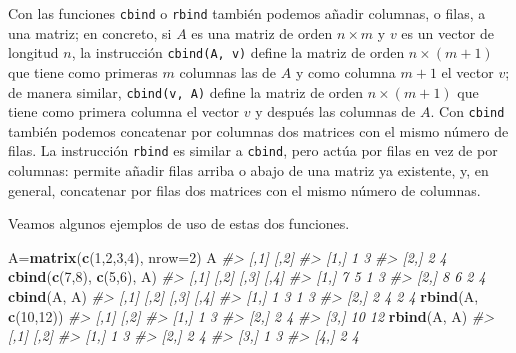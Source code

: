 \documentclass[
]{book}
\newenvironment{Shaded}{\begin{snugshade}}{\end{snugshade}}
\newcommand{\CommentTok}[1]{\textcolor[rgb]{0.56,0.35,0.01}{\textit{#1}}}
\newcommand{\DataTypeTok}[1]{\textcolor[rgb]{0.13,0.29,0.53}{#1}}
\newcommand{\DecValTok}[1]{\textcolor[rgb]{0.00,0.00,0.81}{#1}}
\newcommand{\KeywordTok}[1]{\textcolor[rgb]{0.13,0.29,0.53}{\textbf{#1}}}
\newcommand{\NormalTok}[1]{#1}
\theoremstyle{definition}
\theoremstyle{definition}
\theoremstyle{definition}
\theoremstyle{remark}
\begin{document}
Con las funciones \texttt{cbind} o \texttt{rbind} también podemos añadir columnas, o filas, a una matriz; en concreto, si \(A\) es una matriz de orden \(n\times m\) y \(v\) es un vector de longitud \(n\), la instrucción \texttt{cbind(A,\ v)} define la matriz de orden \(n\times(m+1)\) que tiene como primeras \(m\) columnas las de \(A\) y como columna \(m+1\) el vector \(v\); de manera similar, \texttt{cbind(v,\ A)} define la matriz de orden \(n\times(m+1)\) que tiene como primera columna el vector \(v\) y después las columnas de \(A\). Con \texttt{cbind} también podemos concatenar por columnas dos matrices con el mismo número de filas. La instrucción \texttt{rbind} es similar a \texttt{cbind}, pero actúa por filas en vez de por columnas: permite añadir filas arriba o abajo de una matriz ya existente, y, en general, concatenar por filas dos matrices con el mismo número de columnas.

Veamos algunos ejemplos de uso de estas dos funciones.

\begin{Shaded}
\begin{Highlighting}[]
\NormalTok{A=}\KeywordTok{matrix}\NormalTok{(}\KeywordTok{c}\NormalTok{(}\DecValTok{1}\NormalTok{,}\DecValTok{2}\NormalTok{,}\DecValTok{3}\NormalTok{,}\DecValTok{4}\NormalTok{), }\DataTypeTok{nrow=}\DecValTok{2}\NormalTok{)}
\NormalTok{A}
\CommentTok{\#\textgreater{}      [,1] [,2]}
\CommentTok{\#\textgreater{} [1,]    1    3}
\CommentTok{\#\textgreater{} [2,]    2    4}
\KeywordTok{cbind}\NormalTok{(}\KeywordTok{c}\NormalTok{(}\DecValTok{7}\NormalTok{,}\DecValTok{8}\NormalTok{), }\KeywordTok{c}\NormalTok{(}\DecValTok{5}\NormalTok{,}\DecValTok{6}\NormalTok{), A)}
\CommentTok{\#\textgreater{}      [,1] [,2] [,3] [,4]}
\CommentTok{\#\textgreater{} [1,]    7    5    1    3}
\CommentTok{\#\textgreater{} [2,]    8    6    2    4}
\KeywordTok{cbind}\NormalTok{(A, A)}
\CommentTok{\#\textgreater{}      [,1] [,2] [,3] [,4]}
\CommentTok{\#\textgreater{} [1,]    1    3    1    3}
\CommentTok{\#\textgreater{} [2,]    2    4    2    4}
\KeywordTok{rbind}\NormalTok{(A, }\KeywordTok{c}\NormalTok{(}\DecValTok{10}\NormalTok{,}\DecValTok{12}\NormalTok{))}
\CommentTok{\#\textgreater{}      [,1] [,2]}
\CommentTok{\#\textgreater{} [1,]    1    3}
\CommentTok{\#\textgreater{} [2,]    2    4}
\CommentTok{\#\textgreater{} [3,]   10   12}
\KeywordTok{rbind}\NormalTok{(A, A)}
\CommentTok{\#\textgreater{}      [,1] [,2]}
\CommentTok{\#\textgreater{} [1,]    1    3}
\CommentTok{\#\textgreater{} [2,]    2    4}
\CommentTok{\#\textgreater{} [3,]    1    3}
\CommentTok{\#\textgreater{} [4,]    2    4}
\end{Highlighting}
\end{Shaded}
\end{document}
